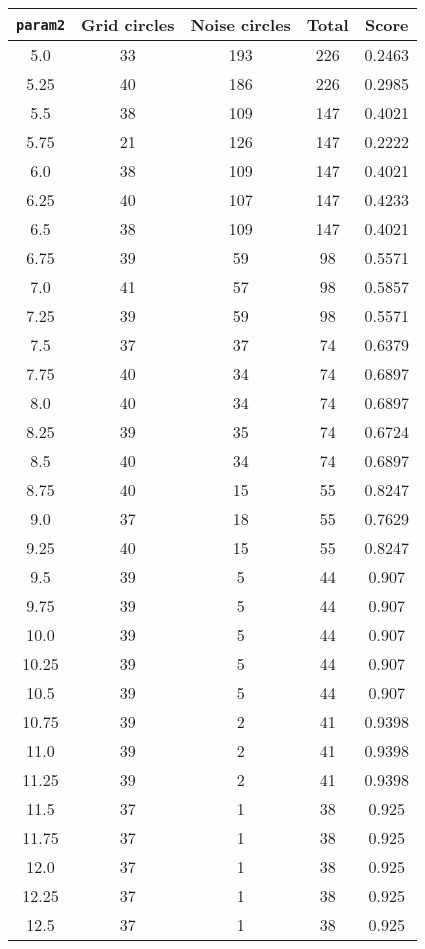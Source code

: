 \documentclass[letterpaper, 12pt]{article}
\begin{document}
\begin{longtable}{|c|c|c|c|c|}
\hline
\textbf{\texttt{param2}} & \textbf{Grid circles} & \textbf{Noise circles} & \textbf{Total} & \textbf{Score} \\
\hline
5.0 & 33 & 193 & 226 & 0.2463 \\
\hline
5.25 & 40 & 186 & 226 & 0.2985 \\
\hline
5.5 & 38 & 109 & 147 & 0.4021 \\
\hline
5.75 & 21 & 126 & 147 & 0.2222 \\
\hline
6.0 & 38 & 109 & 147 & 0.4021 \\
\hline
6.25 & 40 & 107 & 147 & 0.4233 \\
\hline
6.5 & 38 & 109 & 147 & 0.4021 \\
\hline
6.75 & 39 & 59 & 98 & 0.5571 \\
\hline
7.0 & 41 & 57 & 98 & 0.5857 \\
\hline
7.25 & 39 & 59 & 98 & 0.5571 \\
\hline
7.5 & 37 & 37 & 74 & 0.6379 \\
\hline
7.75 & 40 & 34 & 74 & 0.6897 \\
\hline
8.0 & 40 & 34 & 74 & 0.6897 \\
\hline
8.25 & 39 & 35 & 74 & 0.6724 \\
\hline
8.5 & 40 & 34 & 74 & 0.6897 \\
\hline
8.75 & 40 & 15 & 55 & 0.8247 \\
\hline
9.0 & 37 & 18 & 55 & 0.7629 \\
\hline
9.25 & 40 & 15 & 55 & 0.8247 \\
\hline
9.5 & 39 & 5 & 44 & 0.907 \\
\hline
9.75 & 39 & 5 & 44 & 0.907 \\
\hline
10.0 & 39 & 5 & 44 & 0.907 \\
\hline
10.25 & 39 & 5 & 44 & 0.907 \\
\hline
10.5 & 39 & 5 & 44 & 0.907 \\
\hline
10.75 & 39 & 2 & 41 & 0.9398 \\
\hline
11.0 & 39 & 2 & 41 & 0.9398 \\
\hline
11.25 & 39 & 2 & 41 & 0.9398 \\
\hline
11.5 & 37 & 1 & 38 & 0.925 \\
\hline
11.75 & 37 & 1 & 38 & 0.925 \\
\hline
12.0 & 37 & 1 & 38 & 0.925 \\
\hline
12.25 & 37 & 1 & 38 & 0.925 \\
\hline
12.5 & 37 & 1 & 38 & 0.925 \\

\end{longtable}
\end{document}
